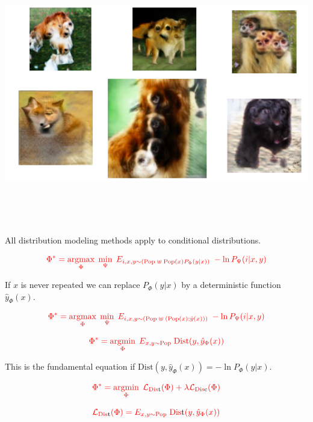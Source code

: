 {

\centerline{\includegraphics[height = 4.5in]{../images/BadGAN}}



All distribution modeling methods apply to conditional distributions.

$${\color{red} \Phi^* = \operatorname*{argmax}_\Phi \; \min_\Psi \;E_{i,x,y \sim (\mathrm{Pop}\; \uplus \;\mathrm{Pop}(x)P_\Phi(y|x))}\;-\ln P_\Psi(i|x,y)}$$

If $x$ is never repeated we can replace $P_\Phi(y|x)$ by a deterministic function $\hat{y}_\Phi(x)$.


$${\color{red} \Phi^* = \operatorname*{argmax}_\Phi \; \min_\Psi \;E_{i,x,y \sim (\mathrm{Pop}\; \uplus \;(\mathrm{Pop}(x);\hat{y}(x)))}\;-\ln P_\Psi(i|x,y)}$$



$${\color{red} \Phi^* = \operatorname*{argmin}_\Phi\; E_{x,y \sim \mathrm{Pop}}\;\mathrm{Dist}(y,\hat{y}_\Phi(x))}$$

This is the fundamental equation if {\color{red} $\mathrm{Dist}(y,\hat{y}_\Phi(x)) = -\ln P_\Phi(y|x)$}.

\vfill
$${\color{red} \Phi^* = \operatorname*{argmin}_\Phi\;{\cal L}_{\mathrm{Dis{\color{black}t}}}(\Phi) + \lambda{\cal L}_{\mathrm{Dis{\color{black}c}}}(\Phi)}$$

$${\color{red}  {\cal L}_{\mathrm{Dis{\color{black}t}}}(\Phi) =  E_{x,y \sim \mathrm{Pop}}\;\mathrm{Dis{\color{black}t}}(y,\hat{y}_{\Phi}(x))}$$

}
